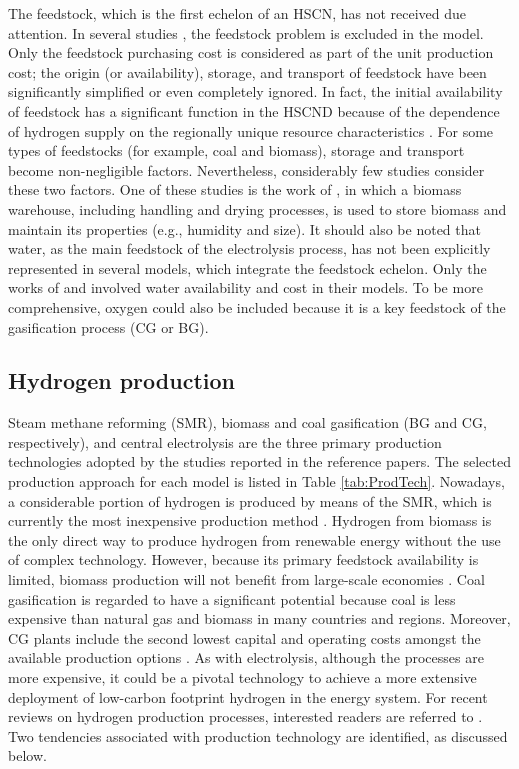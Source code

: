 \documentclass[11pt,3p]{elsarticle}
\begin{document}
The feedstock, which is the first echelon of an HSCN, has not received due attention. In several studies \citep[e.g.,][]{almansoori2006design,kim2008optimization,kim2008strategic,sabio2010strategic}, the feedstock problem is excluded in the model. Only the feedstock purchasing cost is considered as part of the unit production cost; the origin (or availability), storage, and transport of feedstock have been significantly simplified or even completely ignored. In fact, the initial availability of feedstock has a significant function in the HSCND because of the dependence of hydrogen supply on the regionally unique resource characteristics \citep{iea2015technology}. For some types of feedstocks (for example, coal and biomass), storage and transport become non-negligible factors. Nevertheless, considerably few studies consider these two factors. One of these studies is the work of \citet{cho2016optimization}, in which a biomass warehouse, including handling and drying processes, is used to store biomass and maintain its properties (e.g., humidity and size). It should also be noted that water, as the main feedstock of the electrolysis process, has not been explicitly represented in several models, which integrate the feedstock echelon. Only the works of \citet{ogumerem2017multi} and \citet{won2017design} involved water availability and cost in their models. To be more comprehensive, oxygen could also be included because it is a key feedstock of the gasification process (CG or BG).

\subsection{Hydrogen production}

Steam methane reforming (SMR), biomass and coal gasification (BG and CG, respectively), and central electrolysis are the three primary production technologies adopted by the studies reported in the reference papers. The selected production approach for each model is listed in Table \ref{tab:ProdTech}. Nowadays, a considerable portion of hydrogen is produced by means of the SMR, which is currently the most inexpensive production method \citep{dominkovic2017future}. Hydrogen from biomass is the only direct way to produce hydrogen from renewable energy without the use of complex technology. However, because its primary feedstock availability is limited, biomass production will not benefit from large-scale economies \citep{iea2007production}. Coal gasification is regarded to have a significant potential because coal is less expensive than natural gas and biomass in many countries and regions. Moreover, CG plants include the second lowest capital and operating costs amongst the available production options \citep{almansoori2016design}. As with electrolysis, although the processes are more expensive, it could be a pivotal technology to achieve a more extensive deployment of low-carbon footprint hydrogen in the energy system. For recent reviews on hydrogen production processes, interested readers are referred to \citep{nikolaidis2017comparative,hosseini2016hydrogen,dincer2015review}. Two tendencies associated with production technology are identified, as discussed below.
\end{document}
